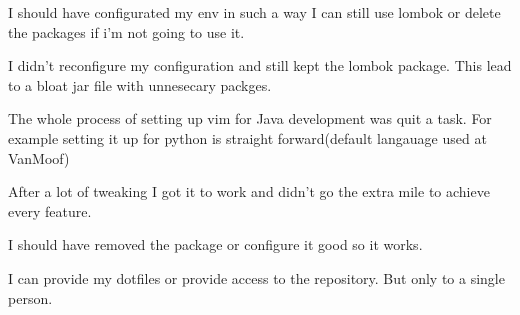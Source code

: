{{{			I should have configurated my env in such a way I can still use lombok or delete the packages if i'm not going to use it.

		}
		{%
			I didn't reconfigure my configuration and still kept the lombok package.
			This lead to a bloat jar file with unnesecary packges.
		}
		{%
			The whole process of setting up vim for Java development was quit a task.
			For example setting it up for python is straight forward(default langauage used at VanMoof)

			After a lot of tweaking I got it to work and didn't go the extra mile to achieve every feature.

			I should have removed the package or configure it good so it works.
		}
		{
			I can provide my dotfiles or provide access to the repository.
			But only to a single person.

}}}
